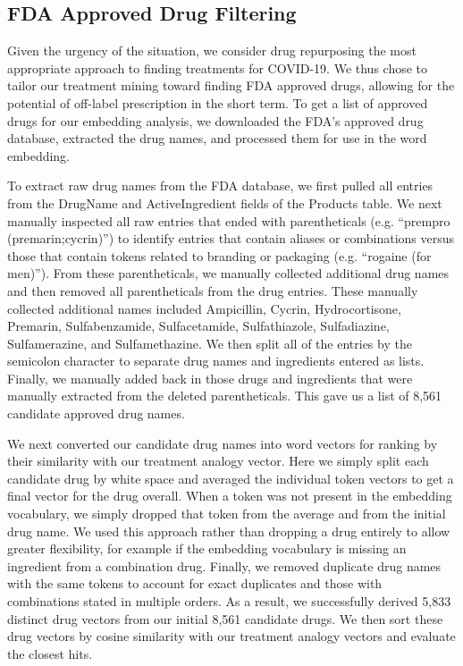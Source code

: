 \documentclass{article}
\begin{document}
\subsection{FDA Approved Drug Filtering}

Given the urgency of the situation, we consider drug repurposing the most appropriate approach to finding treatments for COVID-19.
We thus chose to tailor our treatment mining toward finding FDA approved drugs, allowing for the potential of off-label prescription in the short term.
To get a list of approved drugs for our embedding analysis, we downloaded the FDA's approved drug database\cite{fdadrugs}, extracted the drug names, and processed them for use in the word embedding.

To extract raw drug names from the FDA database, we first pulled all entries from the DrugName and ActiveIngredient fields of the Products table.
We next manually inspected all raw entries that ended with parentheticals (e.g. ``prempro (premarin;cycrin)'') to identify entries that contain aliases or combinations versus those that contain tokens related to branding or packaging (e.g. ``rogaine (for men)'').
From these parentheticals, we manually collected additional drug names and then removed all parentheticals from the drug entries.
These manually collected additional names included Ampicillin, Cycrin, Hydrocortisone, Premarin, Sulfabenzamide, Sulfacetamide, Sulfathiazole, Sulfadiazine, Sulfamerazine, and Sulfamethazine.
We then split all of the entries by the semicolon character to separate drug names and ingredients entered as lists.
Finally, we manually added back in those drugs and ingredients that were manually extracted from the deleted parentheticals.
This gave us a list of 8,561 candidate approved drug names.

We next converted our candidate drug names into word vectors for ranking by their similarity with our treatment analogy vector.
Here we simply split each candidate drug by white space and averaged the individual token vectors to get a final vector for the drug overall.
When a token was not present in the embedding vocabulary, we simply dropped that token from the average and from the initial drug name.
We used this approach rather than dropping a drug entirely to allow greater flexibility, for example if the embedding vocabulary is missing an ingredient from a combination drug.
Finally, we removed duplicate drug names with the same tokens to account for exact duplicates and those with combinations stated in multiple orders.
As a result, we successfully derived 5,833 distinct drug vectors from our initial 8,561 candidate drugs.
We then sort these drug vectors by cosine similarity with our treatment analogy vectors and evaluate the closest hits.
\end{document}
